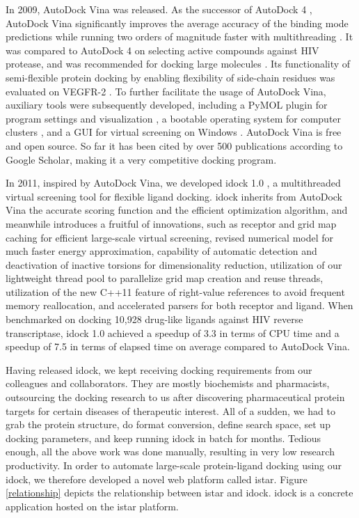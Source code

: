 \documentclass[12pt]{article}
\begin{document}
In 2009, AutoDock Vina \citep{595} was released. As the successor of AutoDock 4 \citep{596}, AutoDock Vina significantly improves the average accuracy of the binding mode predictions while running two orders of magnitude faster with multithreading \citep{595}. It was compared to AutoDock 4 on selecting active compounds against HIV protease, and was recommended for docking large molecules \citep{556}. Its functionality of semi-flexible protein docking by enabling flexibility of side-chain residues was evaluated on VEGFR-2 \citep{1084}. To further facilitate the usage of AutoDock Vina, auxiliary tools were subsequently developed, including a PyMOL plugin for program settings and visualization \citep{609}, a bootable operating system for computer clusters \citep{773}, and a GUI for virtual screening on Windows \citep{1250}. AutoDock Vina is free and open source. So far it has been cited by over 500 publications according to Google Scholar, making it a very competitive docking program.

In 2011, inspired by AutoDock Vina, we developed idock 1.0 \citep{1153}, a multithreaded virtual screening tool for flexible ligand docking. idock inherits from AutoDock Vina the accurate scoring function and the efficient optimization algorithm, and meanwhile introduces a fruitful of innovations, such as receptor and grid map caching for efficient large-scale virtual screening, revised numerical model for much faster energy approximation, capability of automatic detection and deactivation of inactive torsions for dimensionality reduction, utilization of our lightweight thread pool to parallelize grid map creation and reuse threads, utilization of the new C++11 feature of right-value references to avoid frequent memory reallocation, and accelerated parsers for both receptor and ligand. When benchmarked on docking 10,928 drug-like ligands against HIV reverse transcriptase, idock 1.0 achieved a speedup of 3.3 in terms of CPU time and a speedup of 7.5 in terms of elapsed time on average compared to AutoDock Vina.

Having released idock, we kept receiving docking requirements from our colleagues and collaborators. They are mostly biochemists and pharmacists, outsourcing the docking research to us after discovering pharmaceutical protein targets for certain diseases of therapeutic interest. All of a sudden, we had to grab the protein structure, do format conversion, define search space, set up docking parameters, and keep running idock in batch for months. Tedious enough, all the above work was done manually, resulting in very low research productivity. In order to automate large-scale protein-ligand docking using our idock, we therefore developed a novel web platform called istar. Figure \ref{relationship} depicts the relationship between istar and idock. idock is a concrete application hosted on the istar platform.
\end{document}
